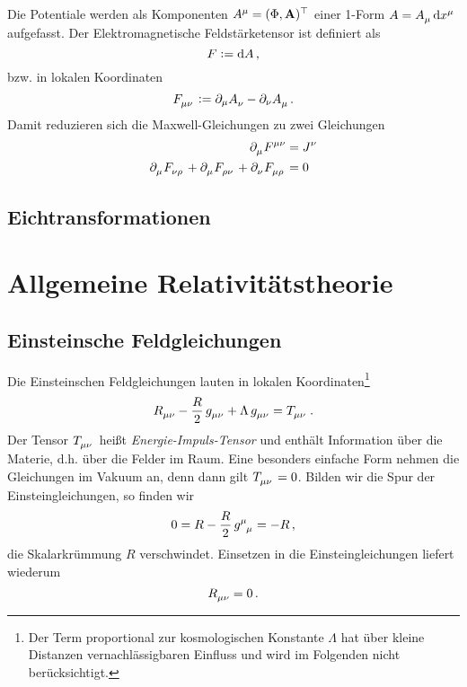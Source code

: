 Die Potentiale werden als Komponenten
$\tensor{A}{^\mu}=(\Phi,\vec{A})\transpose$ einer 1-Form
$A=\tensor{A}{_\mu}\dif\tensor{x}{^\mu}$ aufgefasst. Der Elektromagnetische Feldstärketensor ist definiert als
\begin{equation}
F:=\dif
A\,,
\end{equation}
bzw. in lokalen Koordinaten
\begin{equation}
\tensor{F}{_\mu_\nu}:=\partial_\mu\tensor{A}{_\nu}-\partial_\nu\tensor{A}{_\mu}\,.
\end{equation}
Damit reduzieren sich die Maxwell-Gleichungen zu zwei Gleichungen
\begin{align}
\pdif{_\mu}\tensor{F}{^\mu^\nu}&=\tensor{J}{^\nu}
\label{eq:MaxwellInhom}\\
\pdif{_{\mu}}\tensor{F}{_\nu_{\rho}}+
\pdif{_{\mu}}\tensor{F}{_\rho_{\nu}}+
\pdif{_{\nu}}\tensor{F}{_\mu_{\rho}}&=0
\label{eq:MaxwellHom}
\end{align}
\subsection{Eichtransformationen}
\section{Allgemeine Relativitätstheorie}
\subsection{Einsteinsche Feldgleichungen}
Die Einsteinschen Feldgleichungen lauten in lokalen Koordinaten\footnote{Der
Term proportional zur kosmologischen Konstante $\Lambda$ hat über kleine Distanzen
vernachlässigbaren Einfluss und wird im Folgenden nicht berücksichtigt.}
\begin{equation}
\tensor{R}{_\mu_\nu} - \frac{R}{2}\, \tensor{g}{_\mu_\nu}
+\Lambda\, \tensor{g}{_\mu_\nu}
=\tensor{T}{_\mu_\nu}\,.
\end{equation}
Der Tensor $\tensor{T}{_\mu_\nu}$ heißt \emph{Energie-Impuls-Tensor} und
enthält Information über die Materie, d.h. über die Felder im Raum. Eine
besonders einfache Form nehmen die Gleichungen im Vakuum an, denn dann gilt 
$\tensor{T}{_\mu_\nu}=0$.
Bilden wir die Spur der Einsteingleichungen, so finden wir 
\begin{equation}
0=R- \frac{R}{2}\, \tensor{g}{^\mu_\mu}= -R\,,
\end{equation}
die Skalarkrümmung $R$ verschwindet.
Einsetzen in die Einsteingleichungen liefert wiederum
\begin{equation}
\tensor{R}{_\mu_\nu}=0\,.
\end{equation}
